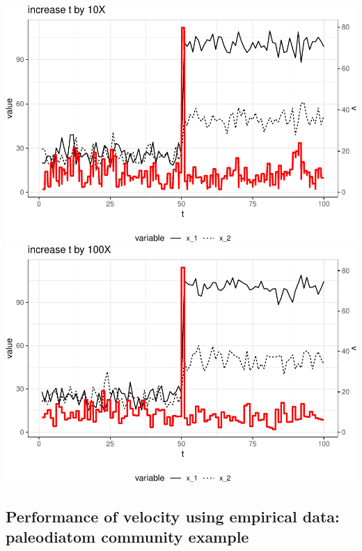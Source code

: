 \documentclass[12pt,twoside,openany]{reedthesis}
\begin{document}
\includegraphics{_myDissertation_files/figure-latex/smoothV-4.pdf}
\includegraphics{_myDissertation_files/figure-latex/smoothV-5.pdf}

\subsection{Performance of velocity using empirical data: paleodiatom
community
example}\label{performance-of-velocity-using-empirical-data-paleodiatom-community-example}
\end{document}
